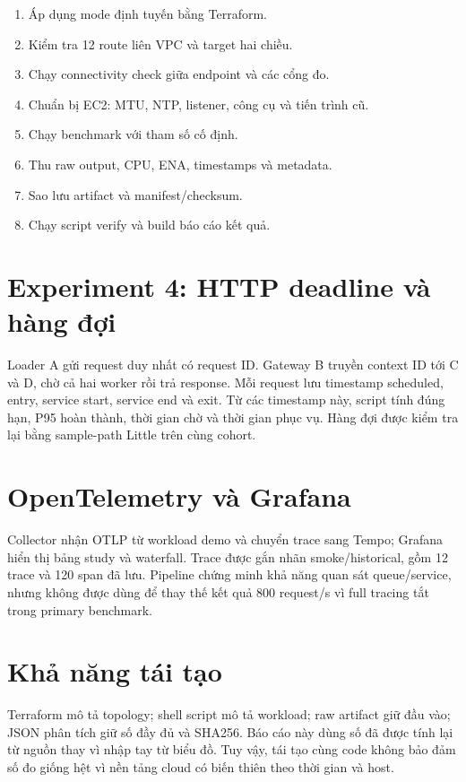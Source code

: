 \begin{enumerate}
  \item Áp dụng mode định tuyến bằng Terraform.
  \item Kiểm tra 12 route liên VPC và target hai chiều.
  \item Chạy connectivity check giữa endpoint và các cổng đo.
  \item Chuẩn bị EC2: MTU, NTP, listener, công cụ và tiến trình cũ.
  \item Chạy benchmark với tham số cố định.
  \item Thu raw output, CPU, ENA, timestamps và metadata.
  \item Sao lưu artifact và manifest/checksum.
  \item Chạy script verify và build báo cáo kết quả.
\end{enumerate}

\section{Experiment 4: HTTP deadline và hàng đợi}

Loader A gửi request duy nhất có request ID. Gateway B truyền context ID tới C
và D, chờ cả hai worker rồi trả response. Mỗi request lưu timestamp scheduled,
entry, service start, service end và exit. Từ các timestamp này, script tính
đúng hạn, P95 hoàn thành, thời gian chờ và thời gian phục vụ. Hàng đợi được
kiểm tra lại bằng sample-path Little trên cùng cohort.

\section{OpenTelemetry và Grafana}

Collector nhận OTLP từ workload demo và chuyển trace sang Tempo; Grafana hiển
thị bảng study và waterfall. Trace được gắn nhãn smoke/historical, gồm 12 trace
và 120 span đã lưu. Pipeline chứng minh khả năng quan sát queue/service, nhưng
không được dùng để thay thế kết quả 800 request/s vì full tracing tắt trong
primary benchmark.




\section{Khả năng tái tạo}

Terraform mô tả topology; shell script mô tả workload; raw artifact giữ đầu
vào; JSON phân tích giữ số đầy đủ và SHA256. Báo cáo này dùng số đã được tính
lại từ nguồn thay vì nhập tay từ biểu đồ. Tuy vậy, tái tạo cùng code không bảo
đảm số đo giống hệt vì nền tảng cloud có biến thiên theo thời gian và host.

